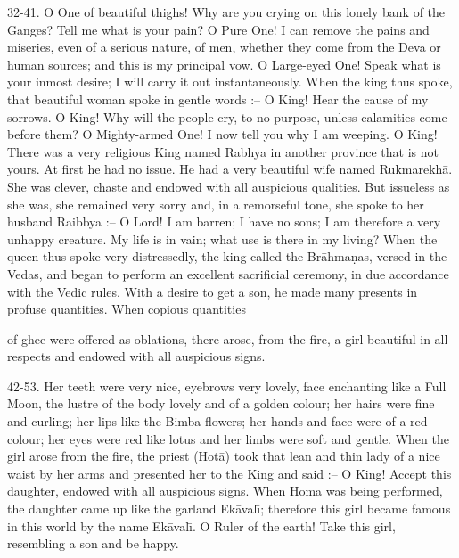 32-41. O One of beautiful thighs! Why are you crying on this lonely bank of the Ganges? Tell me what is your pain? O Pure One! I can remove the pains and miseries, even of a serious nature, of men, whether they come from the Deva or human sources; and this is my principal vow. O Large-eyed One! Speak what is your inmost desire; I will carry it out instantaneously. When the king thus spoke, that beautiful woman spoke in gentle words :-- O King! Hear the cause of my sorrows. O King! Why will the people cry, to no purpose, unless calamities come before them? O Mighty-armed One! I now tell you why I am weeping. O King! There was a very religious King named Rabhya in another province that is not yours. At first he had no issue. He had a very beautiful wife named Rukmarekh\=a. She was clever, chaste and endowed with all auspicious qualities. But issueless as she was, she remained very sorry and, in a remorseful tone, she spoke to her husband Raibbya :-- O Lord! I am barren; I have no sons; I am therefore a very unhappy creature. My life is in vain; what use is there in my living? When the queen thus spoke very distressedly, the king called the Br\=ahma\d{n}as, versed in the Vedas, and began to perform an excellent sacrificial ceremony, in due accordance with the Vedic rules. With a desire to get a son, he made many presents in profuse quantities. When copious quantities

of ghee were offered as oblations, there arose, from the fire, a girl beautiful in all respects and endowed with all auspicious signs.

42-53. Her teeth were very nice, eyebrows very lovely, face enchanting like a Full Moon, the lustre of the body lovely and of a golden colour; her hairs were fine and curling; her lips like the Bimba flowers; her hands and face were of a red colour; her eyes were red like lotus and her limbs were soft and gentle. When the girl arose from the fire, the priest (Hot\=a) took that lean and thin lady of a nice waist by her arms and presented her to the King and said :-- O King! Accept this daughter, endowed with all auspicious signs. When Homa was being performed, the daughter came up like the garland Ek\=aval\={\i}; therefore this girl became famous in this world by the name Ek\=aval\={\i}. O Ruler of the earth! Take this girl, resembling a son and be happy.

